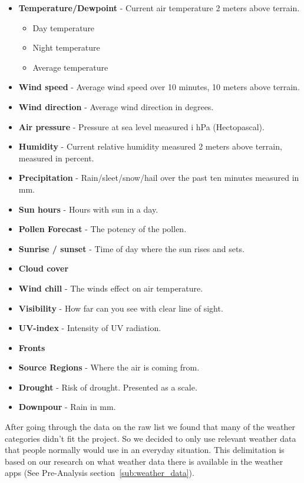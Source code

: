 \begin{itemize}
     \item \textbf{Temperature/Dewpoint} - Current air temperature 2 meters above terrain.
     \begin{itemize}
         \item Day temperature
         \item Night temperature
         \item Average temperature
     \end{itemize}
     \item \textbf{Wind speed} - Average wind speed over 10 minutes, 10 meters above terrain.
     \item \textbf{Wind direction} - Average wind direction in degrees.
     \item \textbf{Air pressure} - Pressure at sea level measured i hPa (Hectopascal).
     \item \textbf{Humidity} - Current relative humidity measured 2 meters above terrain, measured in percent.
     \item \textbf{Precipitation} - Rain/sleet/snow/hail over the past ten minutes measured in mm.
     \item \textbf{Sun hours} - Hours with sun in a day.
     \item \textbf{Pollen Forecast} - The potency of the pollen. 
     \item \textbf{Sunrise / sunset} - Time of day where the sun rises and sets.
     \item \textbf{Cloud cover}
     \item \textbf{Wind chill} - The winds effect on air temperature.
     \item \textbf{Visibility} - How far can you see with clear line of sight.
     \item \textbf{UV-index} - Intensity of UV radiation.
     \item \textbf{Fronts} 
     \item \textbf{Source Regions} - Where the air is coming from.
     \item \textbf{Drought} - Risk of drought. Presented as a scale.
     \item \textbf{Downpour} - Rain in mm.
 \end{itemize}

After going through the data on the raw list we found that many of the weather categories didn’t fit the project. 
So we decided to only use relevant weather data that people normally would use in an everyday situation. 
This delimitation is based on our research on what weather data there is available in the weather apps (See Pre-Analysis section~\ref{sub:weather_data}).

